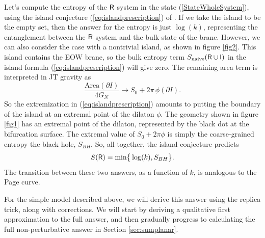 \documentclass[11pt]{article}
\newcommand{\be}{\begin{equation}}
\newcommand{\ee}{\end{equation}}
\numberwithin{equation}{section}
\begin{document}
Let's compute the entropy of the $\sf{R}$ system in the state (\ref{StateWholeSystem}), using the island conjecture (\ref{eq:islandprescription}) of \cite{Penington:2019npb,Almheiri:2019psf,Almheiri:2019hni}. If we take the island to be the empty set, then the answer for the entropy is just $\log(k)$, representing the entanglement between the $\sf{R}$ system and the bulk state of the brane. However, we can also consider the case with a nontrivial island, as shown in figure \ref{fig2}. This island contains the EOW brane, so the bulk entropy term $S_{\text{naive}}(\sf{R}\cup I)$ in the island formula (\ref{eq:islandprescription}) will give zero. The remaining area term is interpreted in JT gravity as
\be
\frac{\text{Area}(\partial I)}{4G_N} \rightarrow  S_0 + 2\pi\, \phi(\partial I).
\ee
So the extremization in (\ref{eq:islandprescription}) amounts to putting the boundary of the island at an extremal point of the dilaton $\phi$. The geometry shown in figure \ref{fig1} has an extremal point of the dilaton, represented by the black dot at the bifurcation surface. The extremal value of $S_0 + 2\pi \phi$ is simply the coarse-grained entropy the black hole, $S_{BH}$. So, all together, the island conjecture predicts
\be
S({\sf{R}}) = \text{min}\big\{\log(k),S_{BH}\big\}.\label{islandC}
\ee
The transition between these two answers, as a function of $k$, is analogous to the Page curve.

For the simple model described above, we will derive this answer using the replica trick, along with corrections. We will start by deriving a qualitative first approximation to the full answer, and then gradually progress to calculating the full non-perturbative answer in Section \ref{sec:sumplanar}.
\end{document}
